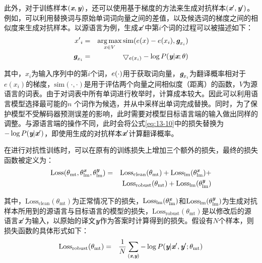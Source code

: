 \parinterval 此外，对于训练样本$(\textbf{\em x},\textbf{\em y})$，还可以使用基于梯度的方法来生成对抗样本$(\textbf{\em x}',\textbf{\em y}')$。例如，可以利用替换词与原始单词词向量之间的差值，以及候选词的梯度之间的相似度来生成对抗样本。以源语言为例，生成$\textbf{\em x}'$中第$i$个词的过程可以被描述如下：
\begin{eqnarray}
{{x}'}_i &=& \operatorname*{arg\,max}_{{x}\in V}\textrm{sim}({e}({x})-{e}({x}_i),\textbf{\em g}_{{x}_i})
\label{eq:13-9} \\
\textbf{\em g}_{{x}_i} &=&  \bigtriangledown_{{e}({x}_i)} - \log {P}(\textbf{\em y}|\textbf{\em x};\theta)
\label{eq:13-10}
\end{eqnarray}

\noindent 其中，${x}_i$为输入序列中的第$i$个词，${e}(\cdot)$用于获取词向量，$\textbf{\em g}_{{x}_i}$为翻译概率相对于$e({x}_i)$的梯度，$\textrm{sim}(\cdot,\cdot)$是用于评估两个向量之间相似度（距离）的函数，$V$为源语言的词表。由于对词表中所有单词进行枚举时，计算成本较大。因此可以利用语言模型选择最可能的$n$ 个词作为候选，并从中采样出单词完成替换。同时，为了保护模型不受解码器预测误差的影响，此时需要对模型目标语言端的输入做出同样的调整。与源语言端的操作不同，此时会将公式\eqref{eq:13-10}中的损失替换为$- \log {P}(\textbf{\em y}|\textbf{\em x}')$，即使用生成的对抗样本$\textbf{\em x}'$计算翻译概率。

\parinterval 在进行对抗性训练时，可以在原有的训练损失上增加三个额外的损失，最终的损失函数被定义为：
\begin{eqnarray}
\textrm{Loss}(\theta_{\textrm{mt}},\theta_{\textrm{lm}}^{\textbf{\em x}},\theta_{\textrm{lm}}^{\textbf{\em y}}) &=& \textrm{Loss}_{\textrm{clean}}(\theta_{\textrm{mt}}) + \textrm{Loss}_{\textrm{lm}}(\theta_{\textrm{lm}}^{\textbf{\em x}}) + \nonumber \\
& & \textrm{Loss}_{\textrm{robust}}(\theta_{\textrm{mt}}) + \textrm{Loss}_{\textrm{lm}}(\theta_{\textrm{lm}}^{\textbf{\em y}})
\label{eq:13-11}
\end{eqnarray}

\noindent 其中，$\textrm{Loss}_{\textrm{clean}}(\theta_{\textrm{mt}})$为正常情况下的损失，$\textrm{Loss}_{\textrm{lm}}(\theta_{\textrm{lm}}^{\textbf{\em x}})$和$\textrm{Loss}_{\textrm{lm}}(\theta_{\textrm{lm}}^{\textbf{\em y}})$为生成对抗样本所用到的源语言与目标语言的模型的损失，$\textrm{Loss}_{\textrm{robust}}(\theta_{\textrm{mt}})$是以修改后的源语言$\textbf{\em x}'$为输入，以原始的译文$\textbf{\em y}$作为答案时计算得到的损失。假设有$N$个样本，则损失函数的具体形式如下：
\begin{eqnarray}
\textrm{Loss}_{\textrm{robust}}(\theta_{\textrm{mt}}) &=&  \frac{1}{N}\sum_{(\textbf{\em x},\textbf{\em y})}-\log {P}(\textbf{\em y}|\textbf{\em x}',\textbf{\em y}';\theta_{\textrm{mt}})
\label{eq:13-12}
\end{eqnarray}

